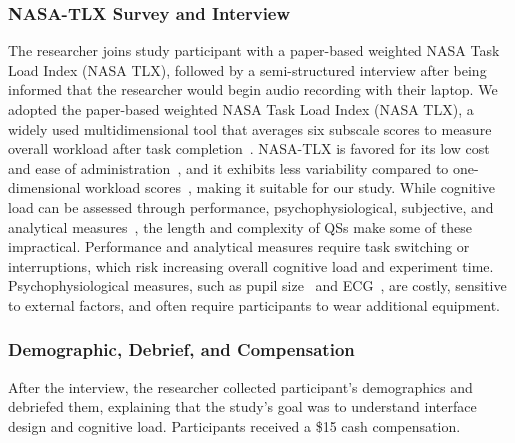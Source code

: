 {\subsubsection{NASA-TLX Survey and Interview}
The researcher joins study participant with a paper-based weighted NASA Task Load Index (NASA TLX), followed by a semi-structured interview after being informed that the researcher would begin audio recording with their laptop. We adopted the paper-based weighted NASA Task Load Index (NASA TLX), a widely used multidimensional tool that averages six subscale scores to measure overall workload after task completion~\cite{hart1988development, hartNasaTaskLoadIndex2006, cain2007review}. NASA-TLX is favored for its low cost and ease of administration~\cite{gaoMentalWorkloadMeasurement2013}, and it exhibits less variability compared to one-dimensional workload scores~\cite{rubioEvaluationSubjectiveMental2004}, making it suitable for our study. While cognitive load can be assessed through performance, psychophysiological, subjective, and analytical measures~\cite{gaoMentalWorkloadMeasurement2013}, the length and complexity of QSs make some of these impractical. Performance and analytical measures require task switching or interruptions, which risk increasing overall cognitive load and experiment time. Psychophysiological measures, such as pupil size~\cite{palinkoEstimatingCognitiveLoad2010} and ECG~\cite{haapalainenPsychophysiologicalMeasuresAssessing2010}, are costly, sensitive to external factors, and often require participants to wear additional equipment.}

\subsubsection{Demographic, Debrief, and Compensation}
After the interview, the researcher collected participant's demographics and debriefed them, explaining that the study's goal was to understand interface design and cognitive load. Participants received a \$15 cash compensation.





